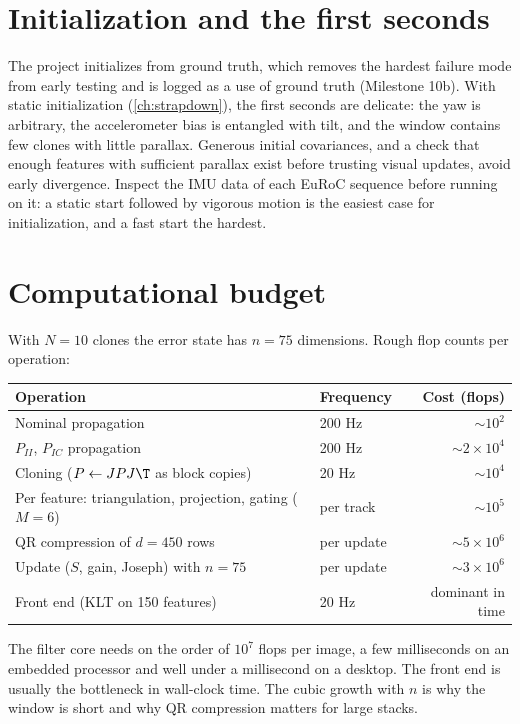 \section{Initialization and the first seconds}

The project initializes from ground truth, which removes the hardest failure mode from early testing and is logged as a use of
ground truth (Milestone 10b). With static initialization (\cref{ch:strapdown}), the first seconds are delicate: the yaw is
arbitrary, the accelerometer bias is entangled with tilt, and the window contains few clones with little parallax. Generous
initial covariances, and a check that enough features with sufficient parallax exist before trusting visual updates, avoid
early divergence. Inspect the IMU data of each EuRoC sequence before running on it: a static start followed by vigorous
motion is the easiest case for initialization, and a fast start the hardest.

\section{Computational budget}

With $N = 10$ clones the error state has $n = 75$ dimensions. Rough flop counts per operation:
\begin{center}\small
\begin{tabular}{@{}l l r@{}}
\toprule
Operation & Frequency & Cost (flops) \\
\midrule
Nominal propagation & 200 Hz & $\sim10^2$ \\
$P_{II}$, $P_{IC}$ propagation & 200 Hz & $\sim2\times10^4$ \\
Cloning ($P \gets JPJ\T$ as block copies) & 20 Hz & $\sim10^4$ \\
Per feature: triangulation, projection, gating ($M = 6$) & per track & $\sim10^5$ \\
QR compression of $d = 450$ rows & per update & $\sim5\times10^6$ \\
Update ($S$, gain, Joseph) with $n = 75$ & per update & $\sim3\times10^6$ \\
Front end (KLT on 150 features) & 20 Hz & dominant in time \\
\bottomrule
\end{tabular}
\end{center}
The filter core needs on the order of $10^7$ flops per image, a few milliseconds on an embedded processor and well under a
millisecond on a desktop. The front end is usually the bottleneck in wall-clock time. The cubic growth with $n$ is why the window
is short and why QR compression matters for large stacks.

